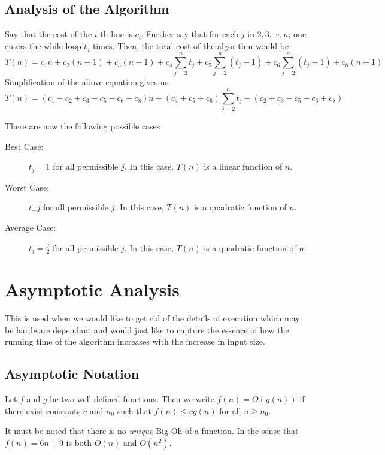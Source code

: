 	\subsection{Analysis of the Algorithm}
	Say that the cost of the $i$-th line is $c_i$. Further say that for each $j$ in $2,3,\cdots,n$; one enters the while loop $t_j$ times. Then, the total cost of the algorithm would be 
	\begin{equation*}
		T(n) = c_1n + c_2(n-1) + c_3(n-1) + c_4\sum_{j=2}^nt_j + c_5\sum_{j=2}^n(t_j-1) + c_6\sum_{j=2}^n(t_j-1) + c_8(n-1)
	\end{equation*}
	Simplification of the above equation gives us
	\begin{equation*}
		T(n) = (c_1+c_2+c_3-c_5-c_6+c_8)n + (c_4+c_5+c_6)\sum_{j=2}^nt_j - (c_2+c_3-c_5-c_6+c_8)
	\end{equation*}

	There are now the following possible cases
	\begin{description}
		\item[Best Case:] $t_j = 1$ for all permissible $j$. In this case, $T(n)$ is a linear function of $n$.
		\item[Worst Case:] $t_ = j$ for all permissible $j$. In this case, $T(n)$ is a quadratic function of $n$.
		\item[Average Case:] $t_j = \frac{j}{2}$ for all permissible $j$. In this case, $T(n)$ is a quadratic function of $n$.
	\end{description}
	
	\section{Asymptotic Analysis}
	This is used when we would like to get rid of the details of execution which may be hardware dependant and would just like to capture the essence of how the running time of the algorithm increases with the increase in input size.
	\subsection{Asymptotic Notation}
	\begin{definition}
		Let $f$ and $g$ be two well defined functions. Then we write $f(n) = O(g(n))$ if there exist constants $c$ and $n_0$ such that $f(n)\le cg(n)$ for all $n\ge n_0$.
	\end{definition}
	It must be noted that there is no \textit{unique} Big-Oh of a function. In the sense that $f(n) = 6n + 9$ is both $O(n)$ and $O(n^2)$.


